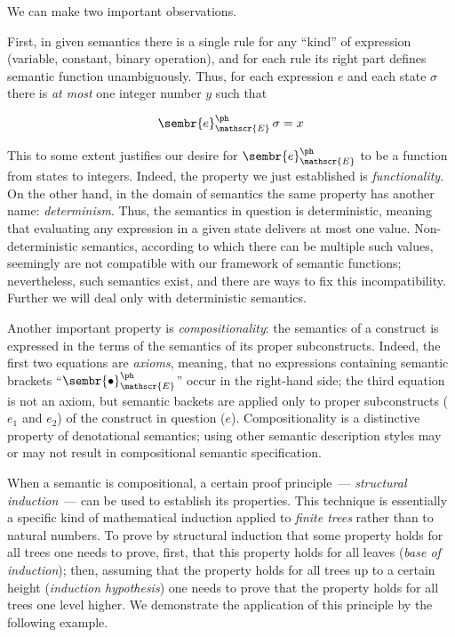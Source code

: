 We can make two important observations.

First, in given semantics there is a single rule for any ``kind'' of expression (variable, constant, binary operation), and for each rule its right part defines
semantic function unambiguously. Thus, for each expression $e$ and each state $\sigma$ there is \emph{at most} one
integer number $y$ such that

\[
  \sembr{e}^\ph_\mathscr{E}\,\sigma=x
\]

This to some extent justifies our desire for $\sembr{e}^\ph_\mathscr{E}$ to be a function from states to integers. Indeed, the
property we just established is \emph{functionality}. On the other hand, in the domain of semantics the same property has
another name: \emph{determinism}. Thus, the semantics in question is deterministic, meaning that evaluating any expression in a given state
delivers at most one value. Non-deterministic semantics, according to which there can be multiple such values, seemingly are not
compatible with our framework of semantic functions; nevertheless, such semantics exist, and there are ways to fix this incompatibility.
Further we will deal only with deterministic semantics.

Another important property is \emph{compositionality}: the semantics of a construct is expressed in the terms of the semantics
of its proper subconstructs. Indeed, the first two equations are \emph{axioms}, meaning, that no expressions containing semantic
brackets ``$\sembr{\bullet}^\ph_\mathscr{E}$'' occur in the right-hand side; the third equation is not an axiom, but semantic
backets are applied only to proper subconstructs ($e_1$ and $e_2$) of the construct in question ($e$). Compositionality is
a distinctive property of denotational semantics; using other semantic description styles may or may not result in compositional
semantic specification.

When a semantic is compositional, a certain proof principle~--- \emph{structural induction}~--- can be used to establish
its properties. This technique is essentially a specific kind of mathematical induction applied to \emph{finite trees} rather than to
natural numbers. To prove by structural induction that some property holds for all trees one needs to prove, first, that this
property holds for all leaves (\emph{base of induction}); then, assuming that the property holds for all trees up to a certain
height (\emph{induction hypothesis}) one needs to prove that the property holds for all trees one level higher. We demonstrate
the application of this principle by the following example.

